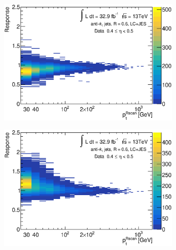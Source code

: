 \begin{figure}[ht]
    \centering
    \begin{subfigure}[b]{0.495\textwidth}
        \centering
        \includegraphics[width=\textwidth]{images/Th2_Data_2lc_eta49}
        \caption{}
    \end{subfigure}
    \hfill
    \begin{subfigure}[b]{0.495\textwidth}
        \centering
        \includegraphics[width=\textwidth]{images/Th2_data_6lc_eta49}
        \caption{}
    \end{subfigure}
    \vfill
    \begin{subfigure}[b]{0.495\textwidth}
        \centering

\end{subfigure}
\end{figure}
